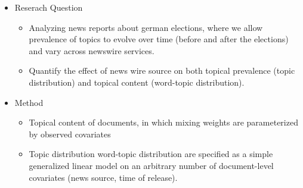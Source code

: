\documentclass[12pt,a4paper,notitlepage]{article}
\begin{document}
\begin{itemize}
	\item Reserach Question
	\begin{itemize}
		\item Analyzing news reports about german elections, where we allow prevalence of topics to evolve over time (before and after the elections) and vary across newswire services.
		\item Quantify the effect of news wire source on both topical prevalence (topic distribution) and topical content (word-topic distribution).
	\end{itemize}
	\item Method
	\begin{itemize}
		\item Topical content of documents, in which mixing weights are parameterized by observed covariates
		\item Topic distribution word-topic distribution are specified as a simple generalized linear model on an arbitrary number of document-level covariates (news source, time of release).
	\end{itemize}
\end{itemize}
\end{document}
